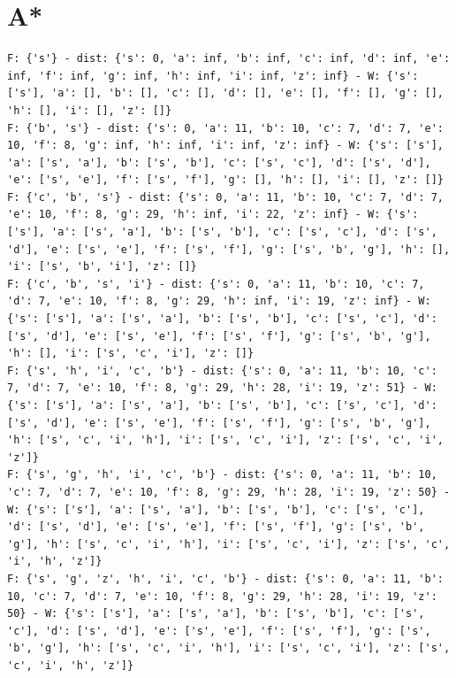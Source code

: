 \documentclass[a4paper,11pt]{report}
\begin{document}
\section{A*}\label{sec:astar}

\begin{verbatim}
F: {'s'} - dist: {'s': 0, 'a': inf, 'b': inf, 'c': inf, 'd': inf, 'e': inf, 'f': inf, 'g': inf, 'h': inf, 'i': inf, 'z': inf} - W: {'s': ['s'], 'a': [], 'b': [], 'c': [], 'd': [], 'e': [], 'f': [], 'g': [], 'h': [], 'i': [], 'z': []}
F: {'b', 's'} - dist: {'s': 0, 'a': 11, 'b': 10, 'c': 7, 'd': 7, 'e': 10, 'f': 8, 'g': inf, 'h': inf, 'i': inf, 'z': inf} - W: {'s': ['s'], 'a': ['s', 'a'], 'b': ['s', 'b'], 'c': ['s', 'c'], 'd': ['s', 'd'], 'e': ['s', 'e'], 'f': ['s', 'f'], 'g': [], 'h': [], 'i': [], 'z': []}
F: {'c', 'b', 's'} - dist: {'s': 0, 'a': 11, 'b': 10, 'c': 7, 'd': 7, 'e': 10, 'f': 8, 'g': 29, 'h': inf, 'i': 22, 'z': inf} - W: {'s': ['s'], 'a': ['s', 'a'], 'b': ['s', 'b'], 'c': ['s', 'c'], 'd': ['s', 'd'], 'e': ['s', 'e'], 'f': ['s', 'f'], 'g': ['s', 'b', 'g'], 'h': [], 'i': ['s', 'b', 'i'], 'z': []}
F: {'c', 'b', 's', 'i'} - dist: {'s': 0, 'a': 11, 'b': 10, 'c': 7, 'd': 7, 'e': 10, 'f': 8, 'g': 29, 'h': inf, 'i': 19, 'z': inf} - W: {'s': ['s'], 'a': ['s', 'a'], 'b': ['s', 'b'], 'c': ['s', 'c'], 'd': ['s', 'd'], 'e': ['s', 'e'], 'f': ['s', 'f'], 'g': ['s', 'b', 'g'], 'h': [], 'i': ['s', 'c', 'i'], 'z': []}
F: {'s', 'h', 'i', 'c', 'b'} - dist: {'s': 0, 'a': 11, 'b': 10, 'c': 7, 'd': 7, 'e': 10, 'f': 8, 'g': 29, 'h': 28, 'i': 19, 'z': 51} - W: {'s': ['s'], 'a': ['s', 'a'], 'b': ['s', 'b'], 'c': ['s', 'c'], 'd': ['s', 'd'], 'e': ['s', 'e'], 'f': ['s', 'f'], 'g': ['s', 'b', 'g'], 'h': ['s', 'c', 'i', 'h'], 'i': ['s', 'c', 'i'], 'z': ['s', 'c', 'i', 'z']}
F: {'s', 'g', 'h', 'i', 'c', 'b'} - dist: {'s': 0, 'a': 11, 'b': 10, 'c': 7, 'd': 7, 'e': 10, 'f': 8, 'g': 29, 'h': 28, 'i': 19, 'z': 50} - W: {'s': ['s'], 'a': ['s', 'a'], 'b': ['s', 'b'], 'c': ['s', 'c'], 'd': ['s', 'd'], 'e': ['s', 'e'], 'f': ['s', 'f'], 'g': ['s', 'b', 'g'], 'h': ['s', 'c', 'i', 'h'], 'i': ['s', 'c', 'i'], 'z': ['s', 'c', 'i', 'h', 'z']}
F: {'s', 'g', 'z', 'h', 'i', 'c', 'b'} - dist: {'s': 0, 'a': 11, 'b': 10, 'c': 7, 'd': 7, 'e': 10, 'f': 8, 'g': 29, 'h': 28, 'i': 19, 'z': 50} - W: {'s': ['s'], 'a': ['s', 'a'], 'b': ['s', 'b'], 'c': ['s', 'c'], 'd': ['s', 'd'], 'e': ['s', 'e'], 'f': ['s', 'f'], 'g': ['s', 'b', 'g'], 'h': ['s', 'c', 'i', 'h'], 'i': ['s', 'c', 'i'], 'z': ['s', 'c', 'i', 'h', 'z']}
\end{verbatim}
\end{document}
